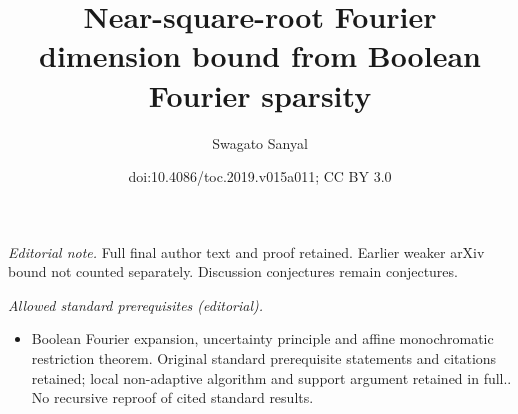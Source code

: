 \documentclass[11pt]{article}
\title{Near-square-root Fourier dimension bound from Boolean Fourier sparsity}
\author{Swagato Sanyal}
\date{doi:10.4086/toc.2019.v015a011; CC BY 3.0}
\numberwithin{equation}{section}
\theoremstyle{definition}
\theoremstyle{plain}
\begin{document}
\maketitle
\noindent\textit{Editorial note.} Full final author text and proof retained. Earlier weaker arXiv bound not counted separately. Discussion conjectures remain conjectures.\par\medskip
\noindent\textit{Allowed standard prerequisites (editorial).}\begin{itemize}
\item Boolean Fourier expansion, uncertainty principle and affine monochromatic restriction theorem. Original standard prerequisite statements and citations retained; local non-adaptive algorithm and support argument retained in full.. No recursive reproof of cited standard results.
\end{itemize}\medskip
\end{document}
